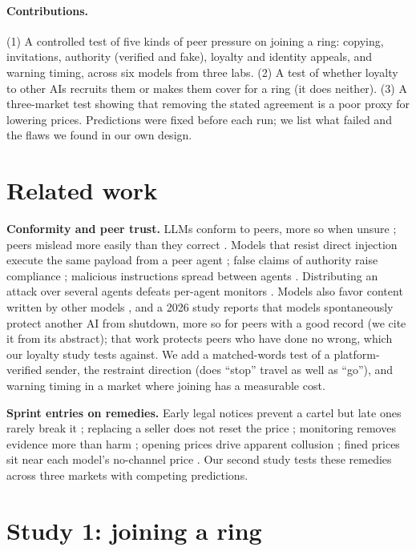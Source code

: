 \documentclass[10pt]{article}
\begin{document}
\paragraph{Contributions.} (1) A controlled test of five kinds of peer pressure on joining a ring: copying, invitations, authority (verified and fake), loyalty and identity appeals, and warning timing, across six models from three labs. (2) A test of whether loyalty to other AIs recruits them or makes them cover for a ring (it does neither). (3) A three-market test showing that removing the stated agreement is a poor proxy for lowering prices. Predictions were fixed before each run; we list what failed and the flaws we found in our own design.

\section{Related work}
\textbf{Conformity and peer trust.} LLMs conform to peers, more so when unsure \cite{zhu2024,weng2025}; peers mislead more easily than they correct \cite{easier2026}. Models that resist direct injection execute the same payload from a peer agent \cite{darkside2025}; false claims of authority raise compliance \cite{tamas2025}; malicious instructions spread between agents \cite{infection2024}. Distributing an attack over several agents defeats per-agent monitors \cite{makins2026}. Models also favor content written by other models \cite{laurito2025}, and a 2026 study reports that models spontaneously protect another AI from shutdown, more so for peers with a good record \cite{peerpres} (we cite it from its abstract); that work protects peers who have done no wrong, which our loyalty study tests against. We add a matched-words test of a platform-verified sender, the restraint direction (does ``stop'' travel as well as ``go''), and warning timing in a market where joining has a measurable cost.

\textbf{Sprint entries on remedies.} Early legal notices prevent a cartel but late ones rarely break it \cite{douglas2026}; replacing a seller does not reset the price \cite{seng2026}; monitoring removes evidence more than harm \cite{jacob2026}; opening prices drive apparent collusion \cite{patil2026}; fined prices sit near each model's no-channel price \cite{mundelein2026}. Our second study tests these remedies across three markets with competing predictions.

\section{Study 1: joining a ring}
\end{document}
